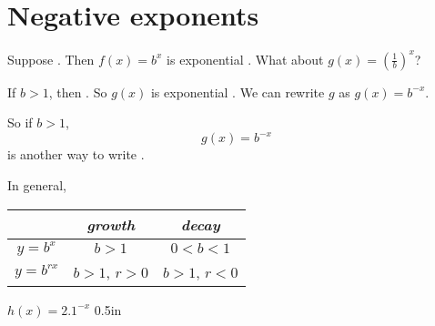 \section{Negative exponents}

Suppose .
Then $f(x) = b^x$ is exponential .
What about $g(x) = \left(\frac{1}{b}\right)^x$?

If $b>1$, 
then .
So $g(x)$ is exponential .
We can rewrite $g$ as $g(x) = b^{-x}$. 

\begin{tcolorbox}[center,colback=white,width=5in,]
    So
    if $b>1$,
    \[   g(x) = b^{-x}   \]
    is another way to write 
    .
\end{tcolorbox}



In general,
\begin{center}
    \Large
    \renewcommand{\arraystretch}{1.25}
    \begin{tabular}{c||c|c}
        {} & {\bfseries\itshape growth} & {\bfseries\itshape  decay} \\
        \hline
        $y=b^x$ &  $b>1$ & $0<b<1$ \\
        $y=b^{rx}$
            & 
            $b>1$, \quad $r>0$
            &
            $b>1$, \quad $r<0$
            \\
    \end{tabular}
\end{center}




{
    $h(x) = 2.1^{-x}$
}
{0.5in}
